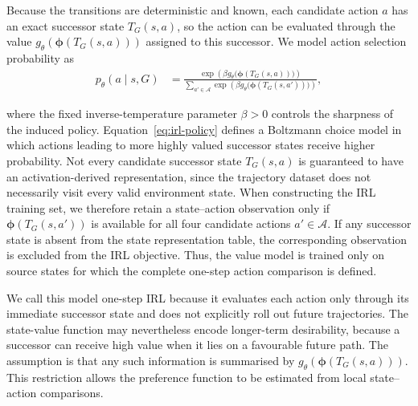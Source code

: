 \documentclass{article}
\begin{document}
Because the transitions are deterministic and known, each candidate action $a$ has an exact successor state $T_G(s,a)$, so the action can be evaluated through the value $g_\theta(\boldsymbol{\phi}(T_G(s,a)))$ assigned to this successor.
We model action selection probability as
\begin{align}
    p_\theta(a\mid s,G)
    &=
    \frac{
        \exp\!\left(
            \beta g_\theta\bigl(\boldsymbol{\phi}(T_G(s,a))\bigr)
        \right)
    }{
        \sum_{a'\in\mathcal A}
        \exp\!\left(
            \beta g_\theta\bigl(\boldsymbol{\phi}(T_G(s,a'))\bigr)
        \right)
    },
    \label{eq:irl-policy}
\end{align}


where the fixed inverse-temperature parameter $\beta>0$ controls the sharpness of the induced policy.
Equation~\ref{eq:irl-policy} defines a Boltzmann choice model in which actions leading to more highly valued successor states receive higher probability.
Not every candidate successor state $T_G(s,a)$ is guaranteed to have an
activation-derived representation, since the trajectory dataset does not
necessarily visit every valid environment state. When constructing the IRL training set, we therefore retain a state--action observation only if
$\boldsymbol{\phi}(T_G(s,a'))$ is available for all four candidate actions
$a' \in \mathcal A$. If any successor state is absent from the state
representation table, the corresponding observation is excluded from the
IRL objective. Thus, the value model is trained only on source states for
which the complete one-step action comparison is defined.


We call this model one-step IRL because it evaluates each action only through its immediate successor state and does not explicitly roll out future trajectories.
The state-value function may nevertheless encode longer-term desirability, because a successor can receive high value when it lies on a favourable future path. 
The assumption is that any such information is summarised by $g_\theta(\boldsymbol{\phi}(T_G(s,a)))$. 
This restriction allows the preference function to be estimated from local state--action comparisons. 
\end{document}
